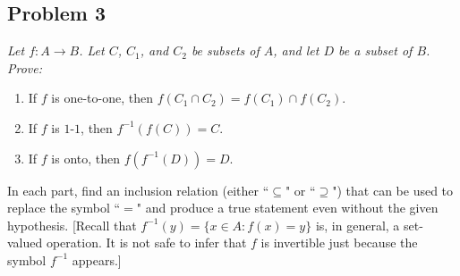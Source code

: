 \documentclass{article}
\begin{document}
\subsection*{Problem 3}
{\it Let $f \colon A \to B$. Let $C$, $C_1$, and $C_2$ be subsets of $A$,
and let $D$ be a subset of $B$. Prove:
\begin{enumerate}
	\item If $f$ is one-to-one, then $f(C_1 \cap C_2) = f(C_1)\cap f(C_2)$.
	\item If $f$ is $1$-$1$, then $f^{-1}(f(C)) = C$.
	\item If $f$ is onto, then $f(f^{-1}(D)) = D$.
\end{enumerate}
In each part, find an inclusion relation
(either ``$\subseteq$" or ``$\supseteq$")
that can be used to replace the symbol ``$=$" and produce
a true statement even without the given hypothesis.
[Recall that $f^{-1}(y) = \{x\in A \colon f(x) = y\}$ is,
in general, a set-valued operation.
It is not safe to infer that $f$ is invertible
just because the symbol $f^{-1}$ appears.]}
\end{document}
